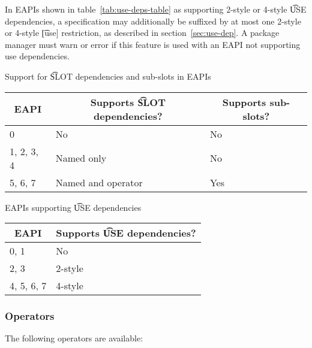  In EAPIs shown in table~\ref{tab:use-deps-table} as supporting 2-style
or 4-style \t{USE} dependencies, a specification may additionally be suffixed by at most one
2-style or 4-style \t{[use]} restriction, as described in section~\ref{sec:use-dep}. A package
manager must warn or error if this feature is used with an EAPI not supporting use dependencies.


\begin{centertable}{Support for \t{SLOT} dependencies and sub-slots in EAPIs}
    \label{tab:slot-deps-table}
    \begin{tabular}{lll}
      \toprule
      \multicolumn{1}{c}{\textbf{EAPI}} &
      \multicolumn{1}{c}{\textbf{Supports \t{SLOT} dependencies?}} &
      \multicolumn{1}{c}{\textbf{Supports sub-slots?}} \\
      \midrule
      0                 & No                 & No  \\
      1, 2, 3, 4        & Named only         & No  \\
      5, 6, 7           & Named and operator & Yes \\
      \bottomrule
    \end{tabular}
\end{centertable}

\begin{centertable}{EAPIs supporting \t{USE} dependencies}
    \label{tab:use-deps-table}
    \begin{tabular}{ll}
      \toprule
      \multicolumn{1}{c}{\textbf{EAPI}} &
      \multicolumn{1}{c}{\textbf{Supports \t{USE} dependencies?}} \\
      \midrule
      0, 1              & No      \\
      2, 3              & 2-style \\
      4, 5, 6, 7        & 4-style \\
      \bottomrule
    \end{tabular}
\end{centertable}

\subsubsection{Operators}
\label{sec:dep-operator}

The following operators are available:

